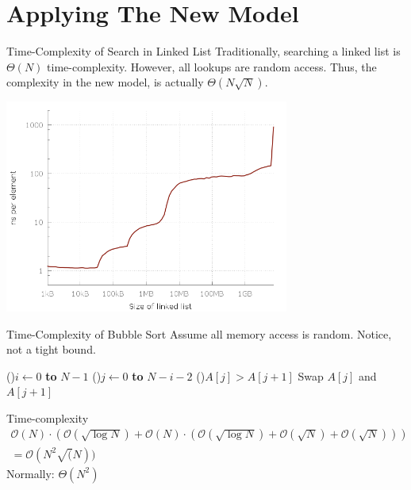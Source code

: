 \documentclass{beamer}
\begin{document}
\section*{Applying The New Model}

\begin{frame}{Time-Complexity of Search in Linked List}
Traditionally, searching a linked list is $\Theta(N)$ time-complexity. However, all lookups are random access. Thus, the complexity in the new model, is actually $\Theta(N \sqrt{N})$.

\pause
\begin{center}
\includegraphics[width=0.7\textwidth]{resources/linked_list.png}
\end{center}
\vspace{-1cm}
\end{frame}

\begin{frame}{Time-Complexity of Bubble Sort}
Assume all memory access is random. Notice, not a tight bound.
\begin{algorithm}[H]
\DontPrintSemicolon
{}


\For(){$i \gets 0$ \textbf{to} $N-1$ } {
  \For(){$j \gets 0$ \textbf{to} $N-i-2$} {
      \If(){$A[j] > A[j+1]$} {
        Swap $A[j]$ and $A[j+1]$ 
      }
    }
}
\caption{Bubble Sort}
\end{algorithm}
\pause
Time-complexity
\begin{align*}
  \mathcal{O}(N) \cdot \left(\mathcal{O}(\sqrt{\log N}) + \mathcal{O}(N) \cdot \left( \mathcal{O}(\sqrt{\log N}) + \mathcal{O}(\sqrt{N}) + \mathcal{O}(\sqrt{N})  \right) \right) \\ = \mathcal{O}(N^2 \sqrt(N))
\end{align*}
\pause
Normally: $\Theta(N^2)$
\end{frame}
\end{document}
